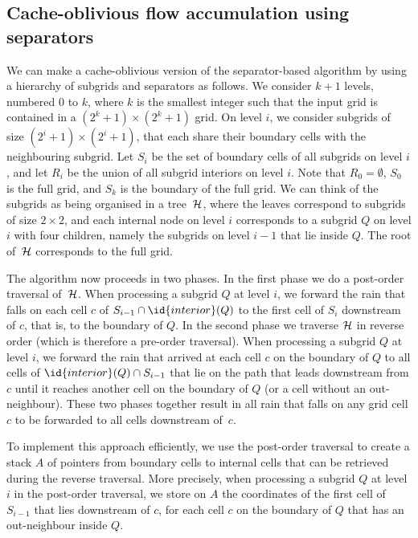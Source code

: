 \documentclass[10pt,a4paper]{article}
\begin{document}
\subsection{Cache-oblivious flow accumulation using separators}\label{sec:cacheobliviousaccumulation}

We can make a cache-oblivious version of the separator-based algorithm by using a hierarchy of subgrids and separators as follows. We consider $k+1$ levels, numbered 0 to $k$, where $k$ is the smallest integer such that the input grid is contained in a $(2^k+1) \times (2^k+1)$ grid. On level $i$, we consider subgrids of size $(2^i + 1) \times (2^i + 1)$, that each share their boundary cells with the neighbouring subgrid. Let $S_i$ be the set of boundary cells of all subgrids on level $i$, and let $R_i$ be the union of all subgrid interiors on level $i$. Note that $R_0 = \emptyset$, $S_0$ is the full grid, and $S_k$ is the boundary of the full grid. We can think of the subgrids as being organised in a tree~${\cal H}$, where the leaves correspond to subgrids of size $2 \times 2$, and each internal node on level $i$ corresponds to a subgrid $Q$ on level $i$ with four children, namely the subgrids on level $i-1$ that lie inside $Q$. The root of~${\cal H}$ corresponds to the full grid.

The algorithm now proceeds in two phases. In the first phase we do a post-order traversal of~${\cal H}$. When processing a subgrid $Q$ at level $i$, we forward the rain that falls on each cell $c$ of $S_{i-1} \cap \id{interior}(Q)$ to the first cell of $S_i$ downstream of $c$, that is, to the boundary of $Q$. In the second phase we traverse ${\cal H}$ in reverse order (which is therefore a pre-order traversal). When processing a subgrid $Q$ at level $i$, we forward the rain that arrived at each cell $c$ on the boundary of $Q$ to all cells of $\id{interior}(Q) \cap S_{i-1}$ that lie on the path that leads downstream from $c$ until it reaches another cell on the boundary of $Q$ (or a cell without an out-neighbour). These two phases together result in all rain that falls on any grid cell $c$ to be forwarded to all cells downstream of~$c$.

To implement this approach efficiently, we use the post-order traversal to create a stack $A$ of pointers from boundary cells to internal cells that can be retrieved during the reverse traversal. More precisely, when processing a subgrid $Q$ at level $i$ in the post-order traversal, we store on $A$ the coordinates of the first cell of $S_{i-1}$ that lies downstream of $c$, for each cell $c$ on the boundary of $Q$ that has an out-neighbour inside $Q$.
\end{document}
